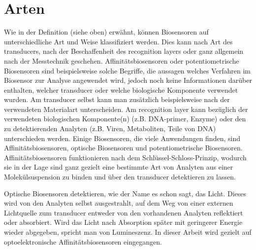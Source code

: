 \section{Arten}
Wie in der Definition (siehe oben) erwähnt, können Biosensoren auf unterschiedliche Art und Weise klassifiziert werden. %
Dies kann nach Art des transducers, nach der Beschaffenheit des recognition layers oder ganz allgemein nach der Messtechnik geschehen. Affinitätsbiosensoren oder potentiometrische Biosensoren sind beispielsweise solche Begriffe, die aussagen welches Verfahren im Biosensor zur Analyse angewendet wird, jedoch noch keine Informationen darüber enthalten, welcher transducer oder welche biologische Komponente verwendet wurden. Am transducer selbst kann man zusätzlich beispielsweise nach der verwendeten Materialart unterscheiden. Am recognition layer kann bezüglich der verwendeten biologischen Komponente(n) (z.B. DNA-primer, Enzyme) oder den zu detektierenden Analyten (z.B. Viren, Metaboliten, Teile von DNA) unterschieden werden.\cite{chemicalsensorsandbiosensors}
Einige Biosensoren, die viele Anwendungen finden, sind Affinitätsbiosensoren, optische Biosensoren und potentiometrische Biosensoren.
Affinitätsbiosensoren funktionieren nach dem Schlüssel-Schloss-Prinzip, wodurch sie in der Lage sind ganz gezielt eine bestimmte Art von Analyten aus einer Molekülsuspension zu binden und über den transducer detektieren zu lassen.\par
Optische Biosensoren detektieren, wie der Name es schon sagt, das Licht. Dieses wird von den Analyten selbst ausgestrahlt, auf dem Weg von einer externen Lichtquelle zum transducer entweder von den vorhandenen Analyten reflektiert oder absorbiert. Wird das Licht nach Absorption später mit geringerer Energie wieder abgegeben, spricht man von Lumineszenz.
In dieser Arbeit wird gezielt auf optoelektronische Affinitätsbiosensoren eingegangen.

